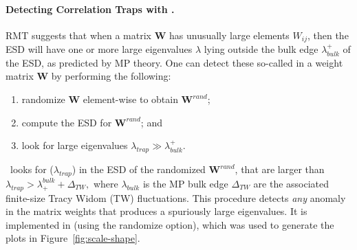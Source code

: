\paragraph{Detecting Correlation Traps with \RMT.}

RMT suggests that when a matrix $\mathbf{W}$ has unusually large elements $W_{ij}$, then the ESD will have one or more large eigenvalues $\lambda$ lying outside the bulk edge $\lambda^{+}_{bulk}$ of the ESD, as predicted by MP theory. 
One can detect these so-called \CorrelationTraps in a weight matrix $\mathbf{W}$ by performing the following:
\begin{enumerate}
\item randomize $\mathbf{W}$ element-wise to obtain $\mathbf{W}^{rand}$;
\item compute the ESD for $\mathbf{W}^{rand}$; and
\item look for large eigenvalues $\lambda_{trap}\gg\lambda^{+}_{bulk}$.
\end{enumerate}
\WW~looks for \CorrelationTraps ($\lambda_{trap}$) in the ESD of the randomized $\mathbf{W}^{rand}$, that are larger than 
$ \lambda_{trap}>\lambda^{bulk}_{+}+\Delta_{TW} , $ 
where 
$\lambda_{bulk}$ is the MP bulk edge $\Delta_{TW}$ are the associated finite-size Tracy Widom (TW) fluctuations. 
This procedure detects \emph{any} anomaly in the matrix weights that produces a spuriously large eigenvalues. 
It is implemented in \WW (using the randomize option), which was used to generate the plots in Figure~\ref{fig:scale-shape}.


